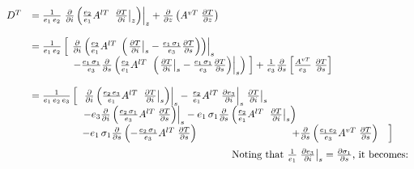 \documentclass[../main/NEMO_manual]{subfiles}
\begin{document}
\begin{align*}
  {
  \begin{array}{*{20}l}
    D^T&=\frac{1}{e_1\,e_2} \left. {\frac{\partial }{\partial i}\left( {\frac{e_2}{e_1}A^{lT}\;\left. {\frac{\partial T}{\partial i}} \right|_z } \right)} \right|_z
         +\frac{\partial }{\partial z}\left( {A^{vT}\;\frac{\partial T}{\partial z}} \right) \\ \\
       &=\frac{1}{e_1\,e_2 }\left[ {\left. {\;\frac{\partial }{\partial i}\left( {\frac{e_2}{e_1}A^{lT}\;\left( {\left. {\frac{\partial T}{\partial i}} \right|_s
         -\frac{e_1\,\sigma_1 }{e_3 }\frac{\partial T}{\partial s}} \right)} \right)} \right|_s } \right. \\
       & \qquad \qquad \left. { -\frac{e_1\,\sigma_1 }{e_3 }\frac{\partial }{\partial s}\left( {\frac{e_2 }{e_1 }A^{lT}\;\left. {\left( {\left. {\frac{\partial T}{\partial i}} \right|_s -\frac{e_1 \,\sigma_1 }{e_3 }\frac{\partial T}{\partial s}} \right)} \right|_s } \right)\;} \right]
         \shoveright{ +\frac{1}{e_3 }\frac{\partial }{\partial s}\left[ {\frac{A^{vT}}{e_3 }\;\frac{\partial T}{\partial s}} \right]}  \qquad \qquad \qquad \\ \\
       &=\frac{1}{e_1 \,e_2 \,e_3 }\left[ {\left. {\;\;\frac{\partial }{\partial i}\left( {\frac{e_2 \,e_3 }{e_1 }A^{lT}\;\left. {\frac{\partial T}{\partial i}} \right|_s } \right)} \right|_s -\left. {\frac{e_2 }{e_1}A^{lT}\;\frac{\partial e_3 }{\partial i}} \right|_s \left. {\frac{\partial T}{\partial i}} \right|_s } \right. \\
       &  \qquad \qquad \quad \left. {-e_3 \frac{\partial }{\partial i}\left( {\frac{e_2 \,\sigma_1 }{e_3 }A^{lT}\;\frac{\partial T}{\partial s}} \right)} \right|_s -e_1 \,\sigma_1 \frac{\partial }{\partial s}\left( {\frac{e_2 }{e_1 }A^{lT}\;\left. {\frac{\partial T}{\partial i}} \right|_s } \right) \\
       &  \qquad \qquad \quad \shoveright{ -e_1 \,\sigma_1 \frac{\partial }{\partial s}\left( {-\frac{e_2 \,\sigma_1 }{e_3 }A^{lT}\;\frac{\partial T}{\partial s}} \right)\;\,\left. {+\frac{\partial }{\partial s}\left( {\frac{e_1 \,e_2 }{e_3 }A^{vT}\;\frac{\partial T}{\partial s}} \right)\quad} \right] }\\
  \end{array}
  } 		\\
  {
  \begin{array}{*{20}l}
    \intertext{Noting that $\frac{1}{e_1} \left. \frac{\partial e_3 }{\partial i} \right|_s = \frac{\partial \sigma_1 }{\partial s}$, it becomes:}

\end{array}}
\end{align*}
\end{document}
